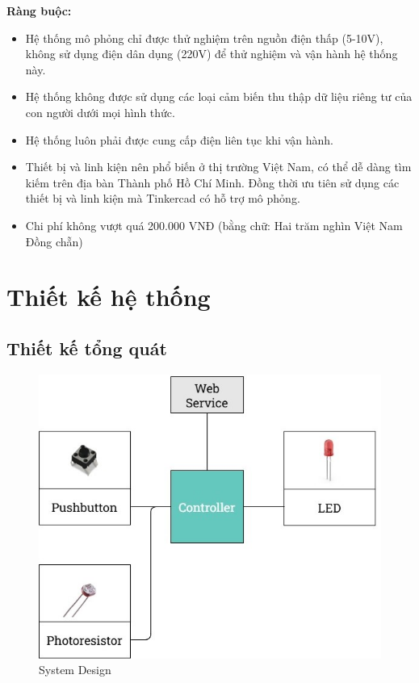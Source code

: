 \textbf{Ràng buộc:} 
\begin{itemize}
    \item Hệ thống mô phỏng chỉ được thử nghiệm trên nguồn điện thấp (5-10V), không sử dụng điện dân dụng (220V) để thử nghiệm và vận hành hệ thống này.
    \item Hệ thống không được sử dụng các loại cảm biến thu thập dữ liệu riêng tư của con người dưới mọi hình thức.
    \item Hệ thống luôn phải được cung cấp điện liên tục khi vận hành.
    \item Thiết bị và linh kiện nên phổ biến ở thị trường Việt Nam, có thể dễ dàng tìm kiếm trên địa bàn Thành phố Hồ Chí Minh. Đồng thời ưu tiên sử dụng các thiết bị và linh kiện mà Tinkercad có hỗ trợ mô phỏng.
    \item Chi phí không vượt quá 200.000 VNĐ (bằng chữ: Hai trăm nghìn Việt Nam Đồng chẵn)
\end{itemize}

\pagebreak
\section{Thiết kế hệ thống}
\subsection{Thiết kế tổng quát}
\begin{figure}[H]
    \centering
    \includegraphics[scale=0.75]{img/SystemDesign.jpg}
    \caption{System Design}
    \label{fig:SystemDesign}
\end{figure}

